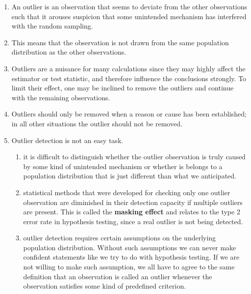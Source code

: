 \begin{enumerate}
    \item An outlier is an observation that seems to deviate from the other observations such that it arouses suspicion that some unintended mechanism has interfered with the random sampling. 
    \hfill \cite{statistics/book/Statistics-for-Data-Scientists/Maurits-Kaptein}
    
    \item This means that the observation is not drawn from the same population distribution as the other observations.
    \hfill \cite{statistics/book/Statistics-for-Data-Scientists/Maurits-Kaptein}

    \item Outliers are a nuisance for many calculations since they may highly affect the estimator or test statistic, and therefore influence the conclusions strongly. 
    To limit their effect, one may be inclined to remove the outliers and continue with the remaining observations. 
    \hfill \cite{statistics/book/Statistics-for-Data-Scientists/Maurits-Kaptein}

    \item Outliers should only be removed when a reason or cause has been established; in all other situations the outlier should not be removed.
    \hfill \cite{statistics/book/Statistics-for-Data-Scientists/Maurits-Kaptein}

    \item Outlier detection is not an easy task. 
    \hfill \cite{statistics/book/Statistics-for-Data-Scientists/Maurits-Kaptein}
    \begin{enumerate}
        \item it is difficult to distinguish whether the outlier observation is truly caused by some kind of unintended mechanism or whether is belongs to a population distribution that is just different than what we anticipated. 
        \hfill \cite{statistics/book/Statistics-for-Data-Scientists/Maurits-Kaptein}

        \item statistical methods that were developed for checking only one outlier observation are diminished in their detection capacity if multiple outliers are present. 
        This is called the \textbf{masking effect} and relates to the type 2 error rate in hypothesis testing, since a real outlier is not being detected. 
        \hfill \cite{statistics/book/Statistics-for-Data-Scientists/Maurits-Kaptein}

        \item outlier detection requires certain assumptions on the underlying population distribution. 
        Without such assumptions we can never make confident statements like we try to do with hypothesis testing. 
        If we are not willing to make such assumption, we all have to agree to the same definition that an observation is called an outlier whenever the observation satisfies some kind of predefined criterion.
        \hfill \cite{statistics/book/Statistics-for-Data-Scientists/Maurits-Kaptein}
    \end{enumerate}


\end{enumerate}
